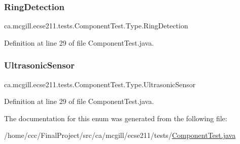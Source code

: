 \subsubsection{\texorpdfstring{Ring\+Detection}{RingDetection}}
{\footnotesize\ttfamily ca.\+mcgill.\+ecse211.\+tests.\+Component\+Test.\+Type.\+Ring\+Detection}



Definition at line 29 of file Component\+Test.\+java.

\mbox{\label{enumca_1_1mcgill_1_1ecse211_1_1tests_1_1_component_test_1_1_type_acb88d74b8bd35b190f8b1b05730c213a}} 
\subsubsection{\texorpdfstring{Ultrasonic\+Sensor}{UltrasonicSensor}}
{\footnotesize\ttfamily ca.\+mcgill.\+ecse211.\+tests.\+Component\+Test.\+Type.\+Ultrasonic\+Sensor}



Definition at line 29 of file Component\+Test.\+java.



The documentation for this enum was generated from the following file\+:\begin{DoxyCompactItemize}
\item 
/home/ccc/\+Final\+Project/src/ca/mcgill/ecse211/tests/\hyperlink{_component_test_8java}{Component\+Test.\+java}\end{DoxyCompactItemize}
